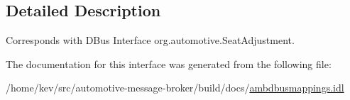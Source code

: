 \subsection{Detailed Description}
Corresponds with D\+Bus Interface org.\+automotive.\+Seat\+Adjustment. 

The documentation for this interface was generated from the following file\+:\begin{DoxyCompactItemize}
\item 
/home/kev/src/automotive-\/message-\/broker/build/docs/\hyperlink{ambdbusmappings_8idl}{ambdbusmappings.\+idl}\end{DoxyCompactItemize}
